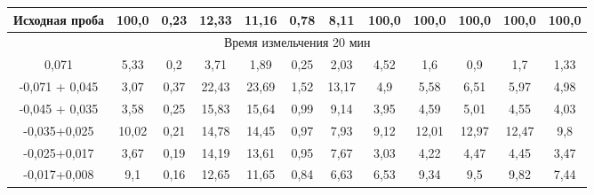 {\begin{longtable}[c]{|p{}ccccccccccc|}
\multicolumn{1}{|c|}{Исходная проба} & \multicolumn{1}{c|}{100,0} & \multicolumn{1}{c|}{0,23} & \multicolumn{1}{c|}{12,33} & \multicolumn{1}{c|}{11,16} & \multicolumn{1}{c|}{0,78} & \multicolumn{1}{c|}{8,11} & \multicolumn{1}{c|}{100,0} & \multicolumn{1}{c|}{100,0} & \multicolumn{1}{c|}{100,0} & \multicolumn{1}{c|}{100,0} & 100,0\\ \hline
\multicolumn{12}{|c|}{Время измельчения 20 мин} \\ \hline
\multicolumn{1}{|c|}{0,071} & \multicolumn{1}{c|}{5,33} & \multicolumn{1}{c|}{0,2} & \multicolumn{1}{c|}{3,71} & \multicolumn{1}{c|}{1,89} & \multicolumn{1}{c|}{0,25} & \multicolumn{1}{c|}{2,03} & \multicolumn{1}{c|}{4,52} & \multicolumn{1}{c|}{1,6} & \multicolumn{1}{c|}{0,9} & \multicolumn{1}{c|}{1,7} & 1,33 \\ \hline
\multicolumn{1}{|c|}{-0,071 + 0,045} & \multicolumn{1}{c|}{3,07} & \multicolumn{1}{c|}{0,37} & \multicolumn{1}{c|}{22,43} & \multicolumn{1}{c|}{23,69} & \multicolumn{1}{c|}{1,52} & \multicolumn{1}{c|}{13,17} & \multicolumn{1}{c|}{4,9} & \multicolumn{1}{c|}{5,58} & \multicolumn{1}{c|}{6,51} & \multicolumn{1}{c|}{5,97} & 4,98 \\ \hline
\multicolumn{1}{|c|}{-0,045 + 0,035} & \multicolumn{1}{c|}{3,58} & \multicolumn{1}{c|}{0,25} & \multicolumn{1}{c|}{15,83} & \multicolumn{1}{c|}{15,64} & \multicolumn{1}{c|}{0,99} & \multicolumn{1}{c|}{9,14} & \multicolumn{1}{c|}{3,95} & \multicolumn{1}{c|}{4,59} & \multicolumn{1}{c|}{5,01} & \multicolumn{1}{c|}{4,55} & 4,03 \\ \hline
\multicolumn{1}{|c|}{-0,035+0,025} & \multicolumn{1}{c|}{10,02} & \multicolumn{1}{c|}{0,21} & \multicolumn{1}{c|}{14,78} & \multicolumn{1}{c|}{14,45} & \multicolumn{1}{c|}{0,97} & \multicolumn{1}{c|}{7,93} & \multicolumn{1}{c|}{9,12} & \multicolumn{1}{c|}{12,01} & \multicolumn{1}{c|}{12,97} & \multicolumn{1}{c|}{12,47} & 9,8 \\ \hline
\multicolumn{1}{|c|}{-0,025+0,017} & \multicolumn{1}{c|}{3,67} & \multicolumn{1}{c|}{0,19} & \multicolumn{1}{c|}{14,19} & \multicolumn{1}{c|}{13,61} & \multicolumn{1}{c|}{0,95} & \multicolumn{1}{c|}{7,67} & \multicolumn{1}{c|}{3,03} & \multicolumn{1}{c|}{4,22} & \multicolumn{1}{c|}{4,47} & \multicolumn{1}{c|}{4,45} & 3,47 \\ \hline
\multicolumn{1}{|c|}{-0,017+0,008} & \multicolumn{1}{c|}{9,1} & \multicolumn{1}{c|}{0,16} & \multicolumn{1}{c|}{12,65} & \multicolumn{1}{c|}{11,65} & \multicolumn{1}{c|}{0,84} & \multicolumn{1}{c|}{6,63} & \multicolumn{1}{c|}{6,53} & \multicolumn{1}{c|}{9,34} & \multicolumn{1}{c|}{9,5} & \multicolumn{1}{c|}{9,82} & 7,44 \\ \hline

\end{longtable}}
